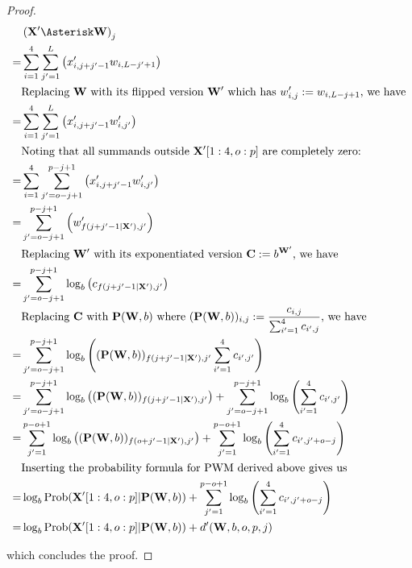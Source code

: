\documentclass[12pt]{article}
\newcommand{\matrixSymbol}[1]{\mathbf{#1}}
\begin{document}
\begin{proof}
\begin{align}
  & \left( \matrixSymbol{X'} \Asterisk \matrixSymbol{W} \right)_j \notag \\
= & \sum_{i=1}^{4}{\sum_{j'=1}^{L}{ \left( x'_{i, j+j'-1}w_{i, L-j'+1} \right) } } \\
  & \text{Replacing $\matrixSymbol{W}$ with its flipped version $\matrixSymbol{W'}$ which has $w'_{i, j} := w_{i, L-j+1}$, we have} \notag \\
= & \sum_{i=1}^{4}{\sum_{j'=1}^{L}{ \left( x'_{i, j+j'-1}w'_{i, j'} \right) }  } \\
  & \text{Noting that all summands outside $\matrixSymbol{X'}[1:4, o:p]$ are completely zero:} \notag \\
= & \sum_{i=1}^{4}{\sum_{j'=o - j + 1}^{p - j + 1}{ \left( x'_{i, j+j'-1}w'_{i, j'} \right) }  } \\
= & \sum_{j'=o - j + 1}^{p - j + 1}{\left( w'_{f(j+j'-1|\matrixSymbol{X'}), j'} \right) } \notag \\
  & \text{Replacing $\matrixSymbol{W'}$ with its exponentiated version $\matrixSymbol{C} := b^{\matrixSymbol{W'}}$, we have} \notag \\
= & \sum_{j'=o - j + 1}^{p - j + 1}{ \log_{b}\left( c_{f(j + j' - 1|\matrixSymbol{X'}), j'} \right) } \\
  & \text{Replacing $\matrixSymbol{C}$ with $\matrixSymbol{P}(\matrixSymbol{W}, b)$ where $ (\matrixSymbol{P}(\matrixSymbol{W}, b))_{i, j}  := \frac{c_{i, j}}{\sum_{i'=1}^{4}{c_{i', j}}} $,  we have} \notag \\
= & \sum_{j'=o - j + 1}^{p - j + 1}{ \log_{b}\left( (\matrixSymbol{P}(\matrixSymbol{W}, b))_{f(j + j' - 1|\matrixSymbol{X'}), j'} \sum_{i'=1}^{4}{c_{i', j'}} \right) } \\
= & \sum_{j'=o - j + 1}^{p - j + 1}{ \log_{b}\left( (\matrixSymbol{P}(\matrixSymbol{W}, b))_{f(j + j' - 1 |\matrixSymbol{X'}), j'} \right) } + \sum_{j'=o - j + 1}^{p - j + 1}{\log_{b} \left( \sum_{i'=1}^{4}{c_{i', j'}} \right) } \notag \\
= & \sum_{j'=1}^{p - o + 1}{ \log_{b}\left( (\matrixSymbol{P}(\matrixSymbol{W}, b))_{f(o + j' - 1|\matrixSymbol{X'}), j'} \right) } + \sum_{j'=1}^{p - o + 1}{\log_{b} \left( \sum_{i'=1}^{4}{c_{i', j' + o - j}} \right) } \notag \\
  & \text{Inserting the probability formula for PWM derived above gives us} \notag \\ 
= & \log_{b}{\mathrm{Prob}(\matrixSymbol{X'}[1:4, o:p]|\matrixSymbol{P}(\matrixSymbol{W}, b))} + \sum_{j'=1}^{p - o + 1}{\log_{b} \left( \sum_{i'=1}^{4}{c_{i', j' + o - j}} \right) } \\
= & \log_{b}{\mathrm{Prob}(\matrixSymbol{X'}[1:4, o:p]|\matrixSymbol{P}(\matrixSymbol{W}, b))} + d'(\matrixSymbol{W}, b, o, p, j) \notag 
\end{align}

which concludes the proof.


\end{proof}
\end{document}
